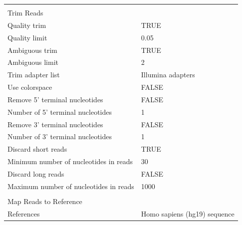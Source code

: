 \begin{longtable}{ll}
                                             &                                                \\
Trim Reads                                   &                                                \\
Quality trim                                 & TRUE                                           \\
Quality limit                                & 0.05                                           \\
Ambiguous trim                               & TRUE                                           \\
Ambiguous limit                              & 2                                              \\
Trim adapter list                            & Illumina adapters                              \\
Use colorspace                               & FALSE                                          \\
Remove 5' terminal nucleotides               & FALSE                                          \\
Number of 5' terminal nucleotides            & 1                                              \\
Remove 3' terminal nucleotides               & FALSE                                          \\
Number of 3' terminal nucleotides            & 1                                              \\
Discard short reads                          & TRUE                                           \\
Minimum number of nucleotides in reads       & 30                                             \\
Discard long reads                           & FALSE                                          \\
Maximum number of nucleotides in reads       & 1000                                           \\
                                             &                                                \\
Map Reads to Reference                       &                                                \\
References                                   & Homo sapiens (hg19) sequence                   \\

\end{longtable}
